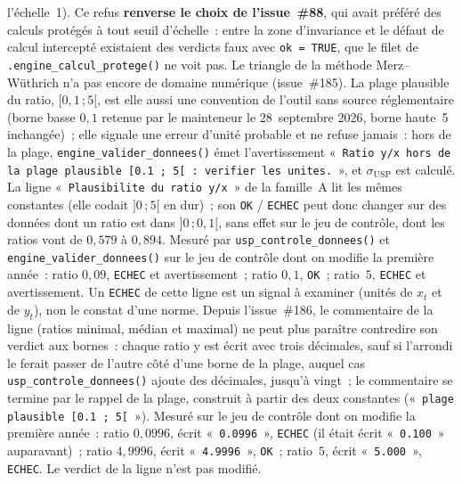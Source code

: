 \documentclass[a4paper,11pt]{article}
\newcommand{\code}[1]{\texttt{\small #1}}
\begin{document}
l'échelle~1). Ce refus \textbf{renverse le choix de l'issue~\#88}, qui avait préféré des calculs
protégés à tout seuil d'échelle~: entre la zone d'invariance et le défaut de calcul intercepté
existaient des verdicts faux avec \code{ok = TRUE}, que le filet de \code{.engine\_calcul\_protege()}
ne voit pas. Le triangle de la méthode Merz--Wüthrich n'a pas encore de domaine numérique
(issue~\#185). La plage plausible du ratio, $[0{,}1\,;5[$, est elle aussi une convention de
l'outil sans source réglementaire (borne basse $0{,}1$ retenue par le mainteneur le
28~septembre 2026, borne haute~5 inchangée)~; elle signale une erreur d'unité probable et ne
refuse jamais~: hors de la plage, \code{engine\_valider\_donnees()} émet l'avertissement
«~\code{Ratio y/x hors de la plage plausible [0.1 ; 5[ : verifier les unites.}~», et
$\sigma_{\mathrm{USP}}$ est calculé. La ligne «~\code{Plausibilite du ratio y/x}~» de la
famille~A lit les mêmes constantes (elle codait $]0\,;5[$ en dur)~; son \code{OK} /
\code{ECHEC} peut donc changer sur des données dont un ratio est dans $]0\,;0{,}1[$, sans effet
sur le jeu de contrôle, dont les ratios vont de $0{,}579$ à $0{,}894$. Mesuré par
\code{usp\_controle\_donnees()} et \code{engine\_valider\_donnees()} sur le jeu de contrôle dont
on modifie la première année~: ratio $0{,}09$, \code{ECHEC} et avertissement~; ratio $0{,}1$,
\code{OK}~; ratio~$5$, \code{ECHEC} et avertissement. Un \code{ECHEC} de cette ligne est un
signal à examiner (unités de $x_t$ et de $y_t$), non le constat d'une norme. Depuis
l'issue~\#186, le commentaire de la ligne (ratios minimal, médian et maximal) ne peut plus
paraître contredire son verdict aux bornes~: chaque ratio y est écrit avec trois décimales, sauf
si l'arrondi le ferait passer de l'autre côté d'une borne de la plage, auquel cas
\code{usp\_controle\_donnees()} ajoute des décimales, jusqu'à vingt~; le commentaire se termine
par le rappel de la plage, construit à partir des deux constantes
(«~\code{plage plausible [0.1 ; 5[}~»). Mesuré sur le jeu de contrôle dont on modifie la
première année~: ratio $0{,}0996$, écrit «~\code{0.0996}~», \code{ECHEC} (il était écrit
«~\code{0.100}~» auparavant)~; ratio $4{,}9996$, écrit «~\code{4.9996}~», \code{OK}~; ratio~$5$,
écrit «~\code{5.000}~», \code{ECHEC}. Le verdict de la ligne n'est pas modifié.
\end{document}
